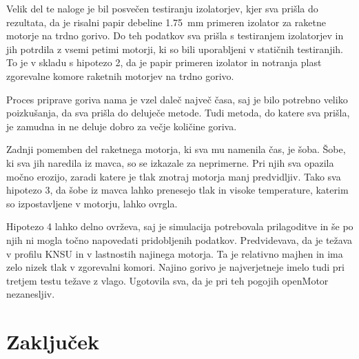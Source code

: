 \documentclass[titlepage, a4paper, twoside, final, 12pt]{article}
\begin{document}
	Velik del te naloge je bil posvečen testiranju izolatorjev, kjer sva prišla do rezultata, da je risalni papir debeline \SI{1,75}{mm} primeren izolator za raketne motorje na trdno gorivo.
	Do teh podatkov sva prišla s testiranjem izolatorjev in jih potrdila z vsemi petimi motorji, ki so bili uporabljeni v statičnih testiranjih. To je v skladu s hipotezo 2, da je papir primeren izolator in notranja plast zgorevalne komore raketnih motorjev na trdno gorivo.

	Proces priprave goriva nama je vzel daleč največ časa, saj je bilo potrebno veliko poizkušanja, da sva prišla do deluječe metode. Tudi metoda, do katere sva prišla, je zamudna in ne deluje dobro za večje količine goriva.
	
	Zadnji pomemben del raketnega motorja, ki sva mu namenila čas, je šoba. Šobe, ki sva jih naredila iz mavca, so se izkazale za neprimerne.
	Pri njih sva opazila močno erozijo, zaradi katere je tlak znotraj motorja manj predvidljiv.
	Tako sva hipotezo 3, da šobe iz mavca lahko prenesejo tlak in visoke temperature, katerim so izpostavljene v motorju, lahko ovrgla.

	Hipotezo 4 lahko delno ovrževa, saj je simulacija potrebovala prilagoditve in še po njih ni mogla točno napovedati pridobljenih podatkov.
	Predvidevava, da je težava v profilu KNSU in v lastnostih najinega motorja. Ta je relativno majhen in ima zelo nizek tlak v zgorevalni komori.
	Najino gorivo je najverjetneje imelo tudi pri tretjem testu težave z vlago. Ugotovila sva, da je pri teh pogojih openMotor nezanesljiv.
	
	\section{Zaključek}
\end{document}
